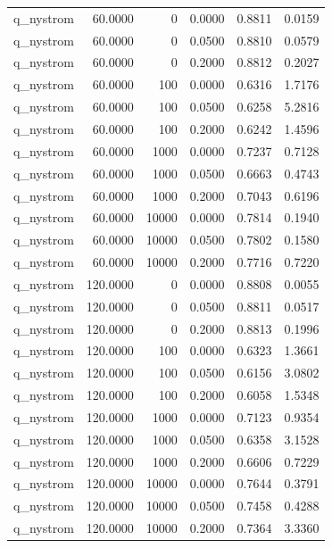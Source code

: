 \begin{table}
\begin{tabular}{lrrrrr}
q\_nystrom & 60.0000 & 0 & 0.0000 & 0.8811 & 0.0159 \\
q\_nystrom & 60.0000 & 0 & 0.0500 & 0.8810 & 0.0579 \\
q\_nystrom & 60.0000 & 0 & 0.2000 & 0.8812 & 0.2027 \\
q\_nystrom & 60.0000 & 100 & 0.0000 & 0.6316 & 1.7176 \\
q\_nystrom & 60.0000 & 100 & 0.0500 & 0.6258 & 5.2816 \\
q\_nystrom & 60.0000 & 100 & 0.2000 & 0.6242 & 1.4596 \\
q\_nystrom & 60.0000 & 1000 & 0.0000 & 0.7237 & 0.7128 \\
q\_nystrom & 60.0000 & 1000 & 0.0500 & 0.6663 & 0.4743 \\
q\_nystrom & 60.0000 & 1000 & 0.2000 & 0.7043 & 0.6196 \\
q\_nystrom & 60.0000 & 10000 & 0.0000 & 0.7814 & 0.1940 \\
q\_nystrom & 60.0000 & 10000 & 0.0500 & 0.7802 & 0.1580 \\
q\_nystrom & 60.0000 & 10000 & 0.2000 & 0.7716 & 0.7220 \\
q\_nystrom & 120.0000 & 0 & 0.0000 & 0.8808 & 0.0055 \\
q\_nystrom & 120.0000 & 0 & 0.0500 & 0.8811 & 0.0517 \\
q\_nystrom & 120.0000 & 0 & 0.2000 & 0.8813 & 0.1996 \\
q\_nystrom & 120.0000 & 100 & 0.0000 & 0.6323 & 1.3661 \\
q\_nystrom & 120.0000 & 100 & 0.0500 & 0.6156 & 3.0802 \\
q\_nystrom & 120.0000 & 100 & 0.2000 & 0.6058 & 1.5348 \\
q\_nystrom & 120.0000 & 1000 & 0.0000 & 0.7123 & 0.9354 \\
q\_nystrom & 120.0000 & 1000 & 0.0500 & 0.6358 & 3.1528 \\
q\_nystrom & 120.0000 & 1000 & 0.2000 & 0.6606 & 0.7229 \\
q\_nystrom & 120.0000 & 10000 & 0.0000 & 0.7644 & 0.3791 \\
q\_nystrom & 120.0000 & 10000 & 0.0500 & 0.7458 & 0.4288 \\
q\_nystrom & 120.0000 & 10000 & 0.2000 & 0.7364 & 3.3360 \\
\bottomrule
\end{tabular}
\end{table}
